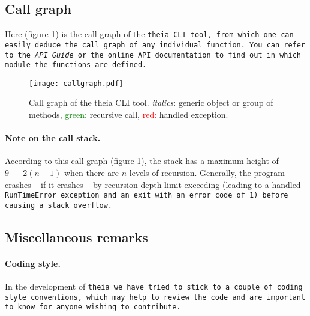 \documentclass{article}
\begin{document}
\subsection{Call graph}
Here (figure \ref{callgraph}) is the call graph of the \tt{theia} CLI tool, from which one can easily deduce the call graph of any individual function. You can refer to the \textit{API Guide} or the online API documentation to find out in which module the functions are defined.


\begin{figure}[h]
\begin{center}
\texttt{[image: callgraph.pdf]}
\end{center}
\caption{Call graph of the theia CLI tool. \textit{italics}: generic object or group of methods, \textcolor{green}{green:} recursive call, \textcolor{red}{red:} handled exception.}
\label{callgraph}
\end{figure}



\paragraph{Note on the  call stack.}According to this call graph (figure \ref{callgraph}), the stack has a maximum height of $9~+~2(n-1)$ when there are $n$ levels of recursion. Generally, the program crashes -- if it crashes -- by recursion depth limit exceeding (leading to a handled \tt{RunTimeError} exception and an exit with an error code of 1) before causing a stack overflow.

\subsection{Miscellaneous remarks}

\paragraph{Coding style.}In the development of \tt{theia} we have tried to stick to a couple of coding style conventions, which may help to review the code and are important to know for anyone wishing to contribute.
\end{document}
